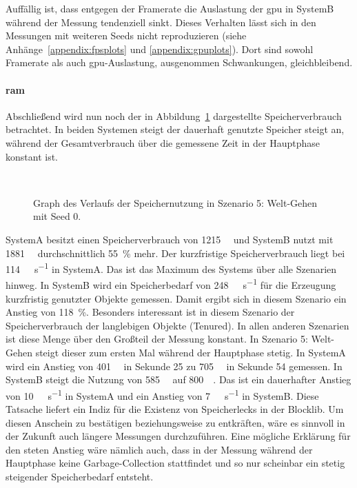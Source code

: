 Auffällig ist, dass entgegen der Framerate die Auslastung der \ac{gpu} in SystemB während der Messung tendenziell sinkt. Dieses Verhalten lässt sich in den Messungen mit weiteren Seeds nicht reproduzieren (siehe Anhänge~\vref{appendix:fpsplots} und \vref{appendix:gpuplots}). Dort sind sowohl Framerate als auch \ac{gpu}-Auslastung, ausgenommen Schwankungen, gleichbleibend.

\paragraph{\ac{ram}}
Abschließend wird nun noch der in Abbildung~\ref{fig:seed-0-walk-mem} dargestellte Speicherverbrauch betrachtet. In beiden Systemen steigt der dauerhaft genutzte Speicher steigt an, während der Gesamtverbrauch über die gemessene Zeit in der Hauptphase konstant ist.
\begin{figure}[!htbp]
	\\
	\caption{Graph des Verlaufs der Speichernutzung in Szenario 5: Welt-Gehen mit Seed 0.}\label{fig:seed-0-walk-mem}
\end{figure} 
SystemA besitzt einen Speicherverbrauch von \SI{1215}{\mega\byte} und SystemB nutzt mit \SI{1881}{\mega\byte} durchschnittlich \SI{55}{\percent} mehr. Der kurzfristige Speicherverbrauch liegt bei \SI{114}{\mega\byte\per\second} in SystemA. Das ist das Maximum des Systems über alle Szenarien hinweg. In SystemB wird ein Speicherbedarf von \SI{248}{\mega\byte\per\second} für die Erzeugung kurzfristig genutzter Objekte gemessen. Damit ergibt sich in diesem Szenario ein Anstieg von \SI{118}{\percent}. Besonders interessant ist in diesem Szenario der Speicherverbrauch der langlebigen Objekte (Tenured). In allen anderen Szenarien ist diese Menge über den Großteil der Messung konstant.
In Szenario 5: Welt-Gehen steigt dieser zum ersten Mal während der Hauptphase stetig. In SystemA wird ein Anstieg von \SI{401}{\mega\byte} in Sekunde 25 zu \SI{705}{\mega\byte} in Sekunde 54 gemessen. In SystemB steigt die Nutzung von \SI{585}{\mega\byte} auf \SI{800}{\mega\byte}. Das ist ein dauerhafter Anstieg von \SI{10}{\mega\byte\per\second} in SystemA und ein Anstieg von \SI{7}{\mega\byte\per\second} in SystemB. Diese Tatsache liefert ein Indiz für die Existenz von Speicherlecks in der Blocklib. Um diesen Anschein zu bestätigen beziehungsweise zu entkräften, wäre es sinnvoll in der Zukunft auch längere Messungen durchzuführen. Eine mögliche Erklärung für den steten Anstieg wäre nämlich auch, dass in der Messung während der Hauptphase keine Garbage-Collection stattfindet und so nur scheinbar ein stetig steigender Speicherbedarf entsteht.

